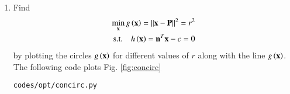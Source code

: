 \renewcommand{\theequation}{\theenumi}
\begin{enumerate}[label=\thesubsection.\arabic*.,ref=\thesubsection.\theenumi]

\item
	\label{convex_code}
Find
\begin{align}
\label{eq:opt_line_nor_h}
	\min_{\mathbf{x}}g\left(\mathbf{x}\right) = \left\lVert\mathbf{x}-\mathbf{P}\right\rVert^2 = r^2 \\
\text{s.t.} \quad 	h\left(\mathbf{x}\right) = \mathbf{n}^T\mathbf{x} - c = 0\label{eq2_1_line}
\end{align}
by plotting the circles $g\left(\mathbf{x}\right)$
%
%
for different values of $r$ along with the line $g\left(\mathbf{x}\right)$.
%
%
\\
\solution 
The following code plots Fig. \ref{fig:concirc}	

%	
\begin{lstlisting}
codes/opt/concirc.py
\end{lstlisting}


\end{enumerate}
